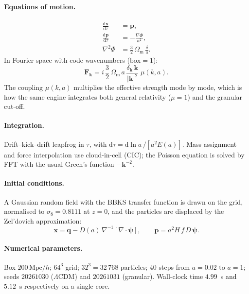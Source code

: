 \documentclass[11pt,a4paper]{article}
\theoremstyle{definition}
\newcommand{\Omm}{\Omega_{\mathrm{m}}}
\newcommand{\muc}{\mu(k,a)}
\newcommand{\Mpc}{\,\mathrm{Mpc}}
\begin{document}
\paragraph{Equations of motion.}
\begin{align}
\frac{\mathrm{d}\mathbf{x}}{\mathrm{d}\tau} &= \mathbf{p},
\label{eq:drift}\\
\frac{\mathrm{d}\mathbf{p}}{\mathrm{d}\tau} &= -\frac{\nabla\Phi}{a^2},
\label{eq:kick}\\
\nabla^2\Phi &= \frac{3}{2}\,\Omm\,\frac{\delta}{a}.
\label{eq:poisson}
\end{align}
In Fourier space with code wavenumbers ($\mathrm{box} = 1$):
\begin{equation}
\mathbf{F}_{\mathbf{k}} = i\,\frac{3}{2}\,\Omm\,a\,
\frac{\delta_{\mathbf{k}}\,\mathbf{k}}{|\mathbf{k}|^2}\;\muc .
\label{eq:forcek}
\end{equation}
The coupling $\muc$ multiplies the effective strength mode by mode, which is
how the same engine integrates both general relativity ($\mu = 1$) and the
granular cut-off.

\paragraph{Integration.} Drift--kick--drift leapfrog in $\tau$, with
$\mathrm{d}\tau = \mathrm{d}\ln a\,/[a^2 E(a)]$. Mass assignment and force
interpolation use cloud-in-cell (CIC); the Poisson equation is solved by FFT
with the usual Green's function $-\mathbf{k}^{-2}$.

\paragraph{Initial conditions.} A Gaussian random field with the BBKS
transfer function \cite{bbks1986} is drawn on the grid, normalised to
$\sigma_8 = 0.8111$ at $z = 0$, and the particles are displaced by the
Zel'dovich approximation:
\begin{equation}
\mathbf{x} = \mathbf{q} - D(a)\,\nabla^{-1}\!\left[\nabla\cdot\boldsymbol{\psi}\right],
\qquad
\mathbf{p} = a^2 H\,f\,D\,\boldsymbol{\psi}.
\end{equation}

\paragraph{Numerical parameters.} Box $200\Mpc/h$; $64^3$ grid; $32^3 =
32\,768$ particles; $40$ steps from $a = 0.02$ to $a = 1$; seeds $20261030$
($\Lambda$CDM) and $20261031$ (granular). Wall-clock time $4.99$~s and
$5.12$~s respectively on a single core.
\end{document}
